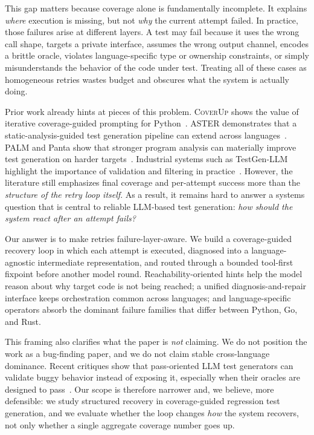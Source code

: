 \documentclass[10pt]{article}
\begin{document}
This gap matters because coverage alone is fundamentally incomplete. It explains \emph{where} execution is missing, but not \emph{why} the current attempt failed. In practice, those failures arise at different layers. A test may fail because it uses the wrong call shape, targets a private interface, assumes the wrong output channel, encodes a brittle oracle, violates language-specific type or ownership constraints, or simply misunderstands the behavior of the code under test. Treating all of these cases as homogeneous retries wastes budget and obscures what the system is actually doing.

Prior work already hints at pieces of this problem. \textsc{CoverUp} shows the value of iterative coverage-guided prompting for Python~\cite{pizzorno2025coverup}. ASTER demonstrates that a static-analysis-guided test generation pipeline can extend across languages~\cite{pan2024aster}. PALM and Panta show that stronger program analysis can materially improve test generation on harder targets~\cite{chu2025palm,gu2025panta}. Industrial systems such as TestGen-LLM highlight the importance of validation and filtering in practice~\cite{alshahwan2024testgenllm}. However, the literature still emphasizes final coverage and per-attempt success more than the \emph{structure of the retry loop itself}. As a result, it remains hard to answer a systems question that is central to reliable LLM-based test generation: \emph{how should the system react after an attempt fails?}

Our answer is to make retries failure-layer-aware. We build a coverage-guided recovery loop in which each attempt is executed, diagnosed into a language-agnostic intermediate representation, and routed through a bounded tool-first fixpoint before another model round. Reachability-oriented hints help the model reason about why target code is not being reached; a unified diagnosis-and-repair interface keeps orchestration common across languages; and language-specific operators absorb the dominant failure families that differ between Python, Go, and Rust.

This framing also clarifies what the paper is \emph{not} claiming. We do not position the work as a bug-finding paper, and we do not claim stable cross-language dominance. Recent critiques show that pass-oriented LLM test generators can validate buggy behavior instead of exposing it, especially when their oracles are designed to pass~\cite{mathews2024designchoices}. Our scope is therefore narrower and, we believe, more defensible: we study structured recovery in coverage-guided regression test generation, and we evaluate whether the loop changes \emph{how} the system recovers, not only whether a single aggregate coverage number goes up.
\end{document}
